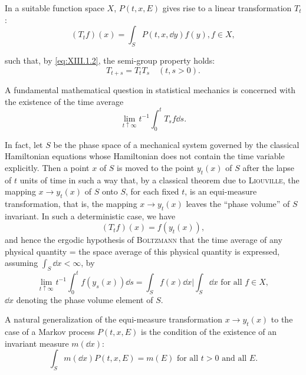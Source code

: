 In a suitable function space $X$, $P(t, x, E)$ gives rise to a linear transformation $T_t$: 
\begin{equation}\label{eq:XIII.1.3}
(T_t f)(x) = \int_{S} P(t, x, \dd y) f(y), f \in X,
\end{equation}

such that, by \eqref{eq:XIII.1.2}, the semi-group property holds: 
\begin{equation}\label{eq:XIII.1.4}
T _{t+s} = T _{t} T _{s} \quad (t, s > 0).
\end{equation}

A fundamental mathematical question in statistical mechanics is concerned with the existence of the time average 
\begin{equation}\label{eq:XIII.1.5}
\lim\limits _{t \uparrow \infty} t ^{-1} \int_{0} ^{t} T _{s} f \dd s.
\end{equation}

In fact, let $S$ be the phase space of a mechanical system governed by the classical Hamiltonian equations whose Hamiltonian does not contain the time variable explicitly. Then a point $x$ of $S$ is moved to the point $y_{t}(x)$ of $S$ after the lapse of $t$ units of time in such a way that, by a classical theorem due to \textsc{Liouville}, the mapping $x \to y_{t}(x)$ of $S$ onto $S$, for each fixed $t$, is an equi-measure transformation, that is, the mapping $x \to y_{t}(x)$ leaves the ``phase volume'' of $S$ invariant. In such a deterministic case, 
we have 
\begin{equation}\label{eq:XIII.1.6}
\left(T _{t} f\right) (x) = f \left(y _{t} (x)\right),
\end{equation}
and hence the ergodic hypothesis of \textsc{Boltzmann} that 
the time average of any physical quantity = the space 
average of this physical quantity 
is expressed, assuming $\int_{S} \dd x < \infty$, by 
\begin{equation}\label{eq:XIII.1.7}
\lim\limits _{t \uparrow \infty} t ^{-1} \int_{0} ^{t} f (y _{s} (x)) \dd s = \int_{S} f (x) \dd x \Big | \int_{S} \dd x \text{ for all } f \in X,
\end{equation}
$\dd x$ denoting the phase volume element of $S$. 


A natural generalization of the equi-measure transformation $x \to y_t(x)$ to the case of a Markov process $P(t, x, E)$ is the condition of the existence of an invariant measure $m(\dd x)$: 
\begin{equation}\label{eq:XIII.1.8}
\int_{S} m (\dd x) P (t, x, E) = m (E) \text{ for all } t > 0 \text{ and all } E.
\end{equation}

